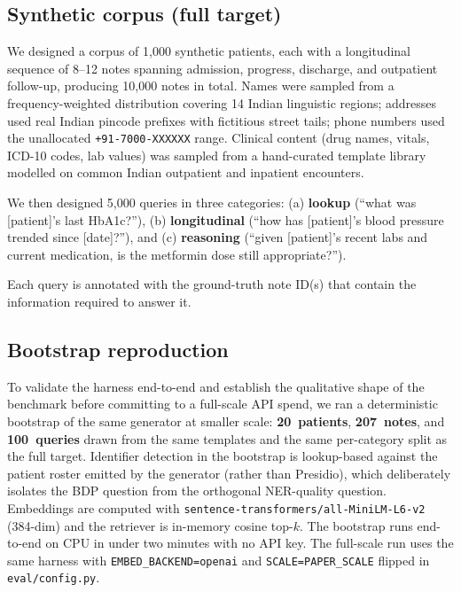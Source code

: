 \documentclass[11pt,a4paper]{article}
\begin{document}
\subsection{Synthetic corpus (full target)}

We designed a corpus of 1{,}000 synthetic patients, each with a
longitudinal sequence of 8--12 notes spanning admission, progress, discharge,
and outpatient follow-up, producing 10{,}000 notes in total. Names were
sampled from a frequency-weighted distribution covering 14 Indian
linguistic regions; addresses used real Indian pincode prefixes with
fictitious street tails; phone numbers used the unallocated
\texttt{+91-7000-XXXXXX} range. Clinical content (drug names, vitals,
ICD-10 codes, lab values) was sampled from a hand-curated template library
modelled on common Indian outpatient and inpatient encounters.

We then designed 5{,}000 queries in three categories:
(a) \textbf{lookup} (``what was [patient]'s last HbA1c?''),
(b) \textbf{longitudinal} (``how has [patient]'s blood pressure trended
since [date]?''), and
(c) \textbf{reasoning} (``given [patient]'s recent labs and current
medication, is the metformin dose still appropriate?'').

Each query is annotated with the ground-truth note ID(s) that contain the
information required to answer it.

\subsection{Bootstrap reproduction}
\label{sec:bootstrap}

To validate the harness end-to-end and establish the qualitative shape of
the benchmark before committing to a full-scale API spend, we ran a
deterministic bootstrap of the same generator at smaller scale:
\textbf{20~patients}, \textbf{207~notes}, and \textbf{100~queries} drawn
from the same templates and the same per-category split as the full target.
Identifier detection in the bootstrap is lookup-based against the
patient roster emitted by the generator (rather than Presidio), which
deliberately isolates the BDP question from the orthogonal NER-quality
question. Embeddings are computed with
\texttt{sentence-transformers/all-MiniLM-L6-v2} (384-dim) and the retriever
is in-memory cosine top-$k$. The bootstrap runs end-to-end on CPU in under
two minutes with no API key. The full-scale run uses the same harness with
\texttt{EMBED\_BACKEND=openai} and \texttt{SCALE=PAPER\_SCALE} flipped in
\texttt{eval/config.py}.
\end{document}
